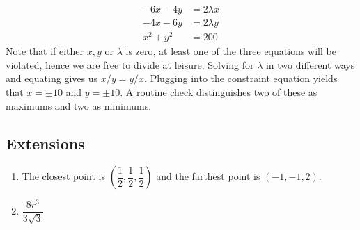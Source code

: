 \begin{enumerate}[resume]
{    \begin{align*}
        -6x-4y &= 2\lambda x\\
        -4x-6y &= 2\lambda y\\
        x^2+y^2 &= 200
    \end{align*}
    Note that if either $x,y$ or $\lambda$ is zero, at least one of the three equations will be violated, hence we are free to divide at leisure. Solving for $\lambda$ in two different ways and equating gives us $x/y = y/x$. Plugging into the constraint equation yields that $x=\pm 10$ and $y=\pm 10$. A routine check distinguishes two of these as maximums and two as minimums.  
    } 
\end{enumerate}
\subsection*{Extensions}
\begin{enumerate}[resume]
    \item {}
    {%
    The closest point is $(\dfrac{1}{2},\dfrac{1}{2},\dfrac{1}{2})$ and the farthest point is $(-1,-1,2)$.
    }
    {%
    } 

	
	\item {}
    {%
    $\dfrac{8r^3}{3\sqrt{3}}$
    }
    {%
    } 
    
\end{enumerate}